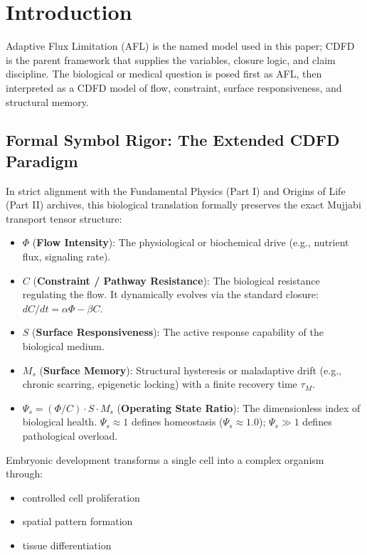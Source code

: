 \documentclass[11pt]{article}
\begin{document}
\section{Introduction}

Adaptive Flux Limitation (AFL) is the named model used in this paper; CDFD is the parent framework that supplies the variables, closure logic, and claim discipline. The biological or medical question is posed first as AFL, then interpreted as a CDFD model of flow, constraint, surface responsiveness, and structural memory.

\subsection{Formal Symbol Rigor: The Extended CDFD Paradigm}
In strict alignment with the Fundamental Physics (Part I) and Origins of Life (Part II) archives, this biological translation formally preserves the exact Mujjabi transport tensor structure:
\begin{itemize}
    \item $\Phi$ (\textbf{Flow Intensity}): The physiological or biochemical drive (e.g., nutrient flux, signaling rate).
    \item $C$ (\textbf{Constraint / Pathway Resistance}): The biological resistance regulating the flow. It dynamically evolves via the standard closure: $dC/dt = \alpha \Phi - \beta C$.
    \item $S$ (\textbf{Surface Responsiveness}): The active response capability of the biological medium.
    \item $M_s$ (\textbf{Surface Memory}): Structural hysteresis or maladaptive drift (e.g., chronic scarring, epigenetic locking) with a finite recovery time $\tau_M$.
    \item $\Psi_s = (\Phi/C) \cdot S \cdot M_s$ (\textbf{Operating State Ratio}): The dimensionless index of biological health. $\Psi_s \approx 1$ defines homeostasis ($\Psi_s \approx 1.0$); $\Psi_s \gg 1$ defines pathological overload.
\end{itemize}


Embryonic development transforms a single cell into a complex organism through:

\begin{itemize}
    \item controlled cell proliferation
    \item spatial pattern formation
    \item tissue differentiation
\end{itemize}
\end{document}
